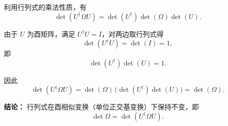 \begin{solution}[酉变换下行列式不变性]

\answer
利用行列式的乘法性质，有
\[
\det(U^\dagger \Omega U)=\det(U^\dagger)\det(\Omega)\det(U).
\]

由于 $U$ 为酉矩阵，满足 $U^\dagger U=I$，对两边取行列式得
\[
\det(U^\dagger U)=\det(I)=1,
\]
即
\[
\det(U^\dagger)\det(U)=1.
\]

因此
\[
\det(U^\dagger \Omega U)=\det(\Omega)\,\big(\det(U^\dagger)\det(U)\big)=\det(\Omega).
\]

\textbf{结论：}
行列式在酉相似变换（单位正交基变换）下保持不变，即
\[
\det \Omega = \det(U^\dagger \Omega U).
\]
\end{solution}